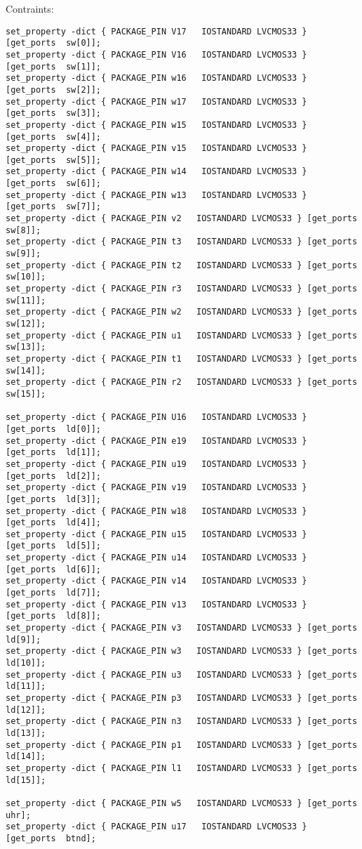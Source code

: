 \documentclass{article}
\begin{document}
Contraints:\newline
\begin{verbatim}
set_property -dict { PACKAGE_PIN V17   IOSTANDARD LVCMOS33 } [get_ports  sw[0]];
set_property -dict { PACKAGE_PIN V16   IOSTANDARD LVCMOS33 } [get_ports  sw[1]];
set_property -dict { PACKAGE_PIN w16   IOSTANDARD LVCMOS33 } [get_ports  sw[2]];
set_property -dict { PACKAGE_PIN w17   IOSTANDARD LVCMOS33 } [get_ports  sw[3]];
set_property -dict { PACKAGE_PIN w15   IOSTANDARD LVCMOS33 } [get_ports  sw[4]];
set_property -dict { PACKAGE_PIN v15   IOSTANDARD LVCMOS33 } [get_ports  sw[5]];
set_property -dict { PACKAGE_PIN w14   IOSTANDARD LVCMOS33 } [get_ports  sw[6]];
set_property -dict { PACKAGE_PIN w13   IOSTANDARD LVCMOS33 } [get_ports  sw[7]];
set_property -dict { PACKAGE_PIN v2   IOSTANDARD LVCMOS33 } [get_ports  sw[8]];
set_property -dict { PACKAGE_PIN t3   IOSTANDARD LVCMOS33 } [get_ports  sw[9]];
set_property -dict { PACKAGE_PIN t2   IOSTANDARD LVCMOS33 } [get_ports  sw[10]];
set_property -dict { PACKAGE_PIN r3   IOSTANDARD LVCMOS33 } [get_ports  sw[11]];
set_property -dict { PACKAGE_PIN w2   IOSTANDARD LVCMOS33 } [get_ports  sw[12]];
set_property -dict { PACKAGE_PIN u1   IOSTANDARD LVCMOS33 } [get_ports  sw[13]];
set_property -dict { PACKAGE_PIN t1   IOSTANDARD LVCMOS33 } [get_ports  sw[14]];
set_property -dict { PACKAGE_PIN r2   IOSTANDARD LVCMOS33 } [get_ports  sw[15]];

set_property -dict { PACKAGE_PIN U16   IOSTANDARD LVCMOS33 } [get_ports  ld[0]];
set_property -dict { PACKAGE_PIN e19   IOSTANDARD LVCMOS33 } [get_ports  ld[1]];
set_property -dict { PACKAGE_PIN u19   IOSTANDARD LVCMOS33 } [get_ports  ld[2]];
set_property -dict { PACKAGE_PIN v19   IOSTANDARD LVCMOS33 } [get_ports  ld[3]];
set_property -dict { PACKAGE_PIN w18   IOSTANDARD LVCMOS33 } [get_ports  ld[4]];
set_property -dict { PACKAGE_PIN u15   IOSTANDARD LVCMOS33 } [get_ports  ld[5]];
set_property -dict { PACKAGE_PIN u14   IOSTANDARD LVCMOS33 } [get_ports  ld[6]];
set_property -dict { PACKAGE_PIN v14   IOSTANDARD LVCMOS33 } [get_ports  ld[7]];
set_property -dict { PACKAGE_PIN v13   IOSTANDARD LVCMOS33 } [get_ports  ld[8]];
set_property -dict { PACKAGE_PIN v3   IOSTANDARD LVCMOS33 } [get_ports  ld[9]];
set_property -dict { PACKAGE_PIN w3   IOSTANDARD LVCMOS33 } [get_ports  ld[10]];
set_property -dict { PACKAGE_PIN u3   IOSTANDARD LVCMOS33 } [get_ports  ld[11]];
set_property -dict { PACKAGE_PIN p3   IOSTANDARD LVCMOS33 } [get_ports  ld[12]];
set_property -dict { PACKAGE_PIN n3   IOSTANDARD LVCMOS33 } [get_ports  ld[13]];
set_property -dict { PACKAGE_PIN p1   IOSTANDARD LVCMOS33 } [get_ports  ld[14]];
set_property -dict { PACKAGE_PIN l1   IOSTANDARD LVCMOS33 } [get_ports  ld[15]];

set_property -dict { PACKAGE_PIN w5   IOSTANDARD LVCMOS33 } [get_ports  uhr];
set_property -dict { PACKAGE_PIN u17   IOSTANDARD LVCMOS33 } [get_ports  btnd];
\end{verbatim}
\end{document}
